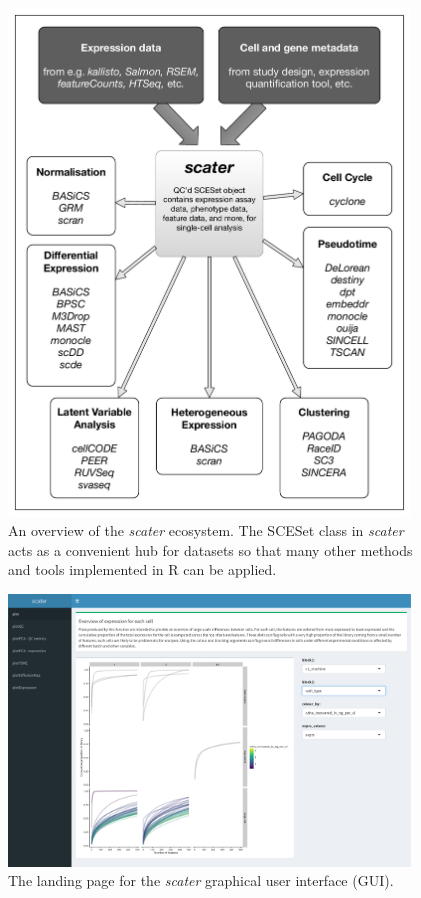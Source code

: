 \documentclass{revtex4}
\begin{document}
\begin{figure}[!tpb]
\centerline{\includegraphics[width=0.95\textwidth]{figures/scater_ecosystem.pdf}}
\caption{An overview of the \emph{scater} ecosystem. The SCESet class in \emph{scater} acts as a convenient hub for datasets so that many other methods and tools implemented in R can be applied.}\label{fig:scater-eco}
\end{figure}


\begin{figure}[!tpb]
\centerline{\includegraphics[width=0.95\textwidth]{figures/scater_gui_landing_page.pdf}}
\caption{The landing page for the \emph{scater} graphical user interface (GUI).}\label{fig:scater-gui-landing}
\end{figure}
\end{document}
